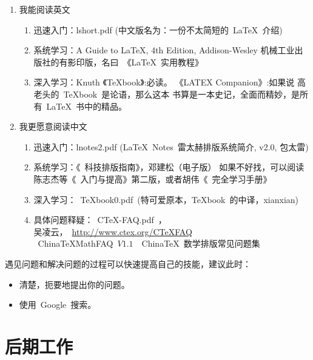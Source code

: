 \begin{enumerate}
\item 我能阅读英文
\begin{enumerate}
\item 迅速入门：lshort.pdf (中文版名为：一份不太简短的~\LaTeX{}~介绍)
\item 系统学习：A Guide to LaTeX, 4th Edition, Addison-Wesley
                机械工业出版社的有影印版，名曰~《\LaTeX{}~实用教程》
\item 深入学习：Knuth 《TeXbook》:必读。 《LATEX Companion》:如果说 高老头的~TeXbook~是论语，那么这本
               书算是一本史记，全面而精妙，是所有~\LaTeX~书中的精品。
\end{enumerate}

\item 我更愿意阅读中文
\begin{enumerate}
\item 迅速入门：lnotes2.pdf (\LaTeX~Notes~雷太赫排版系统简介, v2.0, 包太雷)
\item 系统学习：《\LaTeXe{}~科技排版指南》，邓建松（电子版）
      如果不好找，可以阅读陈志杰等《\LaTeXe~入门与提高》第二版，或者胡伟《\LaTeXe~完全学习手册》
\item 深入学习：~TeXbook0.pdf~(特可爱原本，TeXbook~的中译，xianxian)
\item 具体问题释疑：~CTeX-FAQ.pdf~，\\
        吴凌云，~\url{http://www.ctex.org/CTeXFAQ}~\\
      ~ChinaTeXMathFAQ~$V1.1$~~China\TeX~数学排版常见问题集
\end{enumerate}
\end{enumerate}

遇见问题和解决问题的过程可以快速提高自己的技能，建议此时：
\begin{itemize}
 \item 清楚，扼要地提出你的问题。
 \item 使用~Google~搜索。
\end{itemize}

\section{后期工作}

